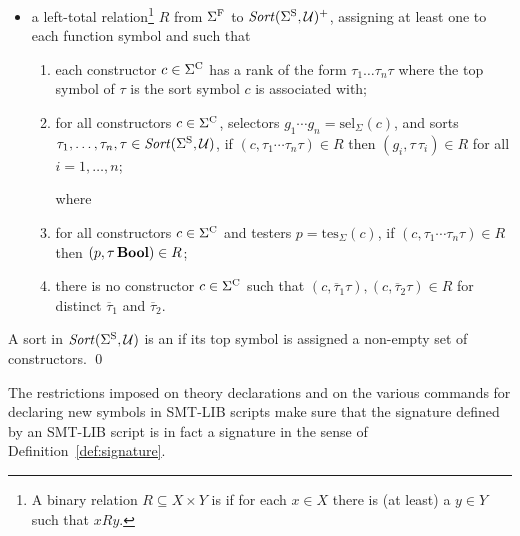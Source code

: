 \begin{definition}
\begin{itemize}
\item
a left-total  relation\footnote{%
A binary relation $R \subseteq X \times Y$ is 
if for each $x \in X$ there is (at least) a $y \in Y$ such that $xRy$.
}
$R$ from $\Sigma^\mathrm{F}$ to $\mathit{Sort}(\Sigma^\mathrm{S}, \mathcal{U})^+$,
assigning at least one  to each function symbol and
such that
\begin{enumerate}
%

\item 
each constructor $c \in \Sigma^\mathrm{C}$ has a rank of the form $\tau_1 \ldots \tau_n\tau$
where the top symbol of $\tau$ is the sort symbol $c$ is associated with;
\item
for all constructors $c \in \Sigma^\mathrm{C}$, 
selectors $g_1 \cdots g_n = \mathrm{sel}_\Sigma(c)$, and
sorts $\tau_1,\ldots,\tau_n,\tau \in \mathit{Sort}(\Sigma^\mathrm{S}, \mathcal{U})$,
if $(c, \tau_1\cdots\tau_n\tau) \in R$
then $(g_i,\tau\,\tau_i) \in R$ for all $i=1,\ldots,n$;

where 

\item
for all constructors $c \in \Sigma^\mathrm{C}$ and 
testers $p = \mathrm{tes}_\Sigma(c)$,
if $(c, \tau_1\cdots\tau_n\tau) \in R$
then $(p,\tau\,\textbf{Bool}) \in R$;

\item
there is no constructor $c \in \Sigma^\mathrm{C}$ such that
$(c, \overline{\tau}_1\tau), (c, \overline{\tau}_2\tau) \in R$ 
for distinct $\overline{\tau}_1$ and $\overline{\tau}_2$.
\end{enumerate}
\end{itemize}

A sort in $\mathit{Sort}(\Sigma^\mathrm{S}, \mathcal{U})$ is an 
if its top symbol is assigned a non-empty set of constructors.
\qed
\end{definition}

\begin{remark}
The restrictions imposed on theory declarations and on the various commands
for declaring new symbols in SMT-LIB scripts make sure that 
the signature defined by an SMT-LIB script is in fact a signature 
in the sense of Definition~\ref{def:signature}.
\end{remark}

